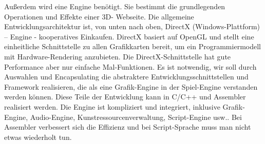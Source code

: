 Außerdem wird eine Engine benötigt. Sie bestimmt die grundlegenden Operationen und Effekte einer 3D- Webseite. Die allgemeine Entwicklungsarchitektur ist, von unten nach oben, DirectX (Windows-Plattform) – Engine - kooperatives Einkaufen. DirectX basiert auf OpenGL und  stellt eine einheitliche Schnittstelle zu allen Grafikkarten bereit, um ein Programmiermodell mit Hardware-Rendering anzubieten. Die DirectX-Schnittstelle hat gute Performance aber nur einfache Mal-Funktionen. Es ist notwendig, wir soll durch Auswahlen und Encapsulating  die abstraktere  Entwicklungsschnittstellen und Framework realisieren, die als eine Grafik-Engine in der Spiel-Engine verstanden werden können. Diese Teile der Entwicklung kann in C/C++ und Assembler realisiert werden. Die Engine ist kompliziert und integriert, inklusive Grafik-Engine, Audio-Engine, Kunstressourcenverwaltung, Script-Engine usw.. Bei  Assembler verbessert sich die Effizienz und bei Script-Sprache muss man nicht etwas wiederholt tun.

